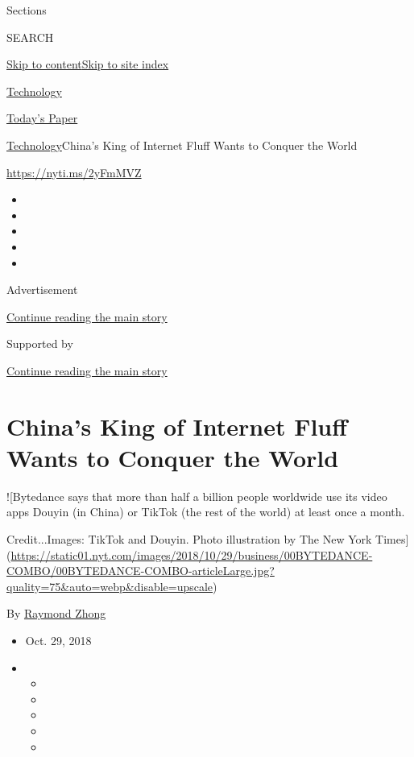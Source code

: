 Sections

SEARCH

\protect\hyperlink{site-content}{Skip to
content}\protect\hyperlink{site-index}{Skip to site index}

\href{https://www.nytimes.com/section/technology}{Technology}

\href{https://myaccount.nytimes.com/auth/login?response_type=cookie\&client_id=vi}{}

\href{https://www.nytimes.com/section/todayspaper}{Today's Paper}

\href{/section/technology}{Technology}\textbar{}China's King of Internet
Fluff Wants to Conquer the World

\url{https://nyti.ms/2yFmMVZ}

\begin{itemize}
\item
\item
\item
\item
\item
\end{itemize}

Advertisement

\protect\hyperlink{after-top}{Continue reading the main story}

Supported by

\protect\hyperlink{after-sponsor}{Continue reading the main story}

\hypertarget{chinas-king-of-internet-fluff-wants-to-conquer-the-world}{%
\section{China's King of Internet Fluff Wants to Conquer the
World}\label{chinas-king-of-internet-fluff-wants-to-conquer-the-world}}

!{[}Bytedance says that more than half a billion people worldwide use
its video apps Douyin (in China) or TikTok (the rest of the world) at
least once a month.

Credit...Images: TikTok and Douyin. Photo illustration by The New York
Times{]}(\url{https://static01.nyt.com/images/2018/10/29/business/00BYTEDANCE-COMBO/00BYTEDANCE-COMBO-articleLarge.jpg?quality=75\&auto=webp\&disable=upscale})

By \href{https://www.nytimes.com/by/raymond-zhong}{Raymond Zhong}

\begin{itemize}
\item
  Oct. 29, 2018
\item
  \begin{itemize}
  \item
  \item
  \item
  \item
  \item
  \end{itemize}
\end{itemize}

